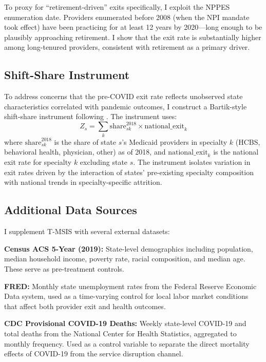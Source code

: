 \documentclass[12pt]{article}
\begin{document}
To proxy for ``retirement-driven'' exits specifically, I exploit the NPPES enumeration date. Providers enumerated before 2008 (when the NPI mandate took effect) have been practicing for at least 12 years by 2020---long enough to be plausibly approaching retirement. I show that the exit rate is substantially higher among long-tenured providers, consistent with retirement as a primary driver.

\subsection{Shift-Share Instrument}

To address concerns that the pre-COVID exit rate reflects unobserved state characteristics correlated with pandemic outcomes, I construct a Bartik-style shift-share instrument following \citet{goldsmithpinkham2020}. The instrument uses:
\begin{equation}
Z_s = \sum_k \text{share}_{sk}^{2018} \times \text{national\_exit}_k
\end{equation}
where $\text{share}_{sk}^{2018}$ is the share of state $s$'s Medicaid providers in specialty $k$ (HCBS, behavioral health, physician, other) as of 2018, and $\text{national\_exit}_k$ is the national exit rate for specialty $k$ excluding state $s$. The instrument isolates variation in exit rates driven by the interaction of states' pre-existing specialty composition with national trends in specialty-specific attrition.

\subsection{Additional Data Sources}

I supplement T-MSIS with several external datasets:

\textbf{Census ACS 5-Year (2019):} State-level demographics including population, median household income, poverty rate, racial composition, and median age. These serve as pre-treatment controls.

\textbf{FRED:} Monthly state unemployment rates from the Federal Reserve Economic Data system, used as a time-varying control for local labor market conditions that affect both provider exit and health outcomes.

\textbf{CDC Provisional COVID-19 Deaths:} Weekly state-level COVID-19 and total deaths from the National Center for Health Statistics, aggregated to monthly frequency. Used as a control variable to separate the direct mortality effects of COVID-19 from the service disruption channel.
\end{document}
